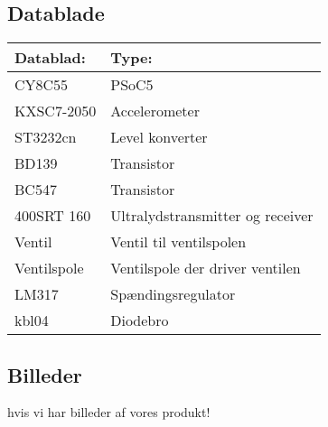 \subsection{Datablade}
\begin{table}[H]
\begin{tabular}{|l|l|}
\hline
\textbf{Datablad:}& \textbf{Type:} \\\hline
CY8C55 & PSoC5 \\\hline
KXSC7-2050& Accelerometer\\\hline
ST3232cn & Level konverter \\\hline
BD139 & Transistor \\\hline
BC547 & Transistor \\\hline
400SRT 160 & Ultralydstransmitter og receiver \\\hline
Ventil & Ventil til ventilspolen \\\hline
Ventilspole & Ventilspole der driver ventilen \\\hline
LM317 & Spændingsregulator \\\hline
kbl04 & Diodebro \\\hline

\end{tabular}
\end{table}


\subsection{Billeder}
hvis vi har billeder af vores produkt!\\

